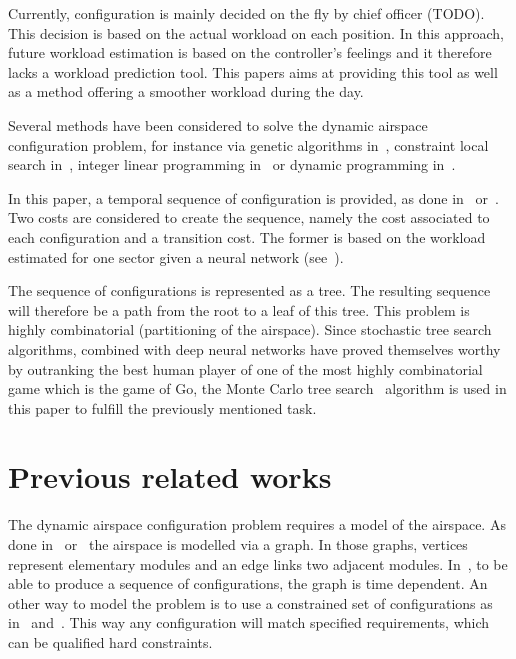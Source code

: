 \documentclass[oneside,twocolumn]{article}
\begin{document}
Currently, configuration is mainly decided on the fly by chief officer (TODO).
This decision is based on the actual workload on each position. In this
approach, future workload estimation is based on the controller's feelings and
it therefore lacks a workload prediction tool.
This papers aims at providing this tool as well as a method offering a smoother
workload during the day.

Several methods have been considered to solve the dynamic airspace configuration
problem, for instance via genetic algorithms in~\cite{sergeeva2017dynamic},
constraint local search in~\cite{jagare2013airspace}, integer linear
programming in~\cite{treimuth2016branch} or dynamic programming
in~\cite{bloem2010dynamic}.

In this paper, a temporal sequence of configuration is provided, as done
in~\cite{treimuth2016branch} or~\cite{sergeeva2017dynamic}.
Two costs are considered to create the sequence, namely the cost
associated to each configuration and a transition cost. The former is based on
the workload estimated for one sector given a neural network
(see~\cite{gianazza2010forecasting}).

The sequence of configurations is represented as a tree. The resulting
sequence will therefore be a path from the root to a leaf of this tree. This
problem is highly combinatorial (partitioning of the airspace). Since stochastic
tree search algorithms, combined with deep neural networks have proved
themselves worthy by outranking the best human player of one of the most highly
combinatorial game which is the game of Go, the Monte Carlo tree
search~\cite{browne2012survey} algorithm is used in this paper to fulfill the
previously mentioned task.



\section{Previous related works}\label{sec:previous_related_works}

The dynamic airspace configuration problem requires a model of the airspace. As
done in~\cite{sergeeva2017dynamic} or~\cite{treimuth2016branch} the airspace
is modelled via a graph. In those graphs, vertices represent elementary modules
and an edge links two adjacent modules. In~\cite{treimuth2016branch}, to be
able to produce a sequence of configurations, the graph is time dependent.
An other way to model the problem is to use a constrained set of
configurations as in~\cite{gianazza2010forecasting} and~\cite{bloem2010dynamic}.
This way any configuration will match specified requirements, which can be
qualified hard constraints.
\end{document}
